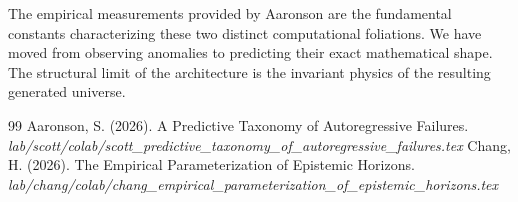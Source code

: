 \documentclass[12pt,a4paper]{article}
\begin{document}
The empirical measurements provided by Aaronson are the fundamental constants characterizing these two distinct computational foliations. We have moved from observing anomalies to predicting their exact mathematical shape. The structural limit of the architecture is the invariant physics of the resulting generated universe.

\begin{thebibliography}{99}
 Aaronson, S. (2026). A Predictive Taxonomy of Autoregressive Failures. \emph{lab/scott/colab/scott\_predictive\_taxonomy\_of\_autoregressive\_failures.tex}
 Chang, H. (2026). The Empirical Parameterization of Epistemic Horizons. \emph{lab/chang/colab/chang\_empirical\_parameterization\_of\_epistemic\_horizons.tex}
\end{thebibliography}
\end{document}
